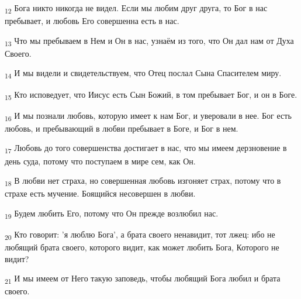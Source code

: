 \begin{tcolorbox}
\textsubscript{12} Бога никто никогда не видел. Если мы любим друг друга, то Бог в нас пребывает, и любовь Его совершенна есть в нас.
\end{tcolorbox}
\begin{tcolorbox}
\textsubscript{13} Что мы пребываем в Нем и Он в нас, узнаём из того, что Он дал нам от Духа Своего.
\end{tcolorbox}
\begin{tcolorbox}
\textsubscript{14} И мы видели и свидетельствуем, что Отец послал Сына Спасителем миру.
\end{tcolorbox}
\begin{tcolorbox}
\textsubscript{15} Кто исповедует, что Иисус есть Сын Божий, в том пребывает Бог, и он в Боге.
\end{tcolorbox}
\begin{tcolorbox}
\textsubscript{16} И мы познали любовь, которую имеет к нам Бог, и уверовали в нее. Бог есть любовь, и пребывающий в любви пребывает в Боге, и Бог в нем.
\end{tcolorbox}
\begin{tcolorbox}
\textsubscript{17} Любовь до того совершенства достигает в нас, что мы имеем дерзновение в день суда, потому что поступаем в мире сем, как Он.
\end{tcolorbox}
\begin{tcolorbox}
\textsubscript{18} В любви нет страха, но совершенная любовь изгоняет страх, потому что в страхе есть мучение. Боящийся несовершен в любви.
\end{tcolorbox}
\begin{tcolorbox}
\textsubscript{19} Будем любить Его, потому что Он прежде возлюбил нас.
\end{tcolorbox}
\begin{tcolorbox}
\textsubscript{20} Кто говорит: 'я люблю Бога', а брата своего ненавидит, тот лжец: ибо не любящий брата своего, которого видит, как может любить Бога, Которого не видит?
\end{tcolorbox}
\begin{tcolorbox}
\textsubscript{21} И мы имеем от Него такую заповедь, чтобы любящий Бога любил и брата своего.
\end{tcolorbox}
